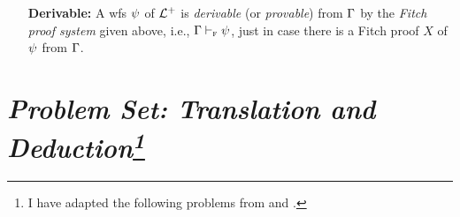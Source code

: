 \documentclass[a4paper, 11pt]{article} %
\begin{document}
\begin{enumerate}
  \item[\bf Derivable:]
    A wfs $\psi$ of $\mathcal{L}^+$ is \textit{derivable} (or \textit{provable}) from $\Gamma$ by the \textit{Fitch proof system} given above, i.e., $\Gamma \vdash_{\textsc{f}} \psi$, just in case there is a Fitch proof $X$ of $\psi$ from $\Gamma$.
\end{enumerate}



\section*{\it Problem Set: Translation and Deduction\footnote{I have adapted the following problems from \citet{Goldfarb2003} and \citet{Laboreo2005}.}}
\end{document}
